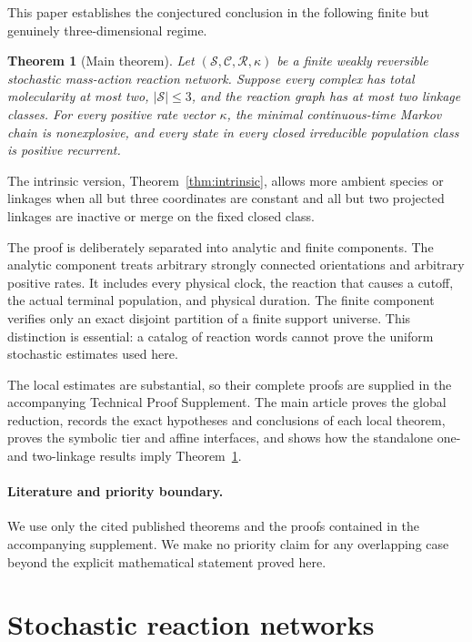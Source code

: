 \documentclass[11pt]{article}
\newtheorem{theorem}{Theorem}[section]
\theoremstyle{definition}
\theoremstyle{remark}
\newcommand{\cC}{\mathcal C}
\newcommand{\cR}{\mathcal R}
\newcommand{\cS}{\mathcal S}
\newcommand{\1}{\mathbf 1}
\begin{document}
This paper establishes the conjectured conclusion in the following finite but
genuinely three-dimensional regime.

\begin{theorem}[Main theorem]\label{thm:main}
Let $(\cS,\cC,\cR,\kappa)$ be a finite weakly reversible stochastic
mass-action reaction network.  Suppose every complex has total molecularity
at most two, $|\cS|\le3$, and the reaction graph has at most two linkage
classes.  For every positive rate vector $\kappa$, the minimal continuous-time
Markov chain is nonexplosive, and every state in every closed irreducible
population class is positive recurrent.
\end{theorem}

The intrinsic version, Theorem~\ref{thm:intrinsic}, allows more ambient
species or linkages when all but three coordinates are constant and all but
two projected linkages are inactive or merge on the fixed closed class.

The proof is deliberately separated into analytic and finite components.
The analytic component treats arbitrary strongly connected orientations and
arbitrary positive rates.  It includes every physical clock, the reaction
that causes a cutoff, the actual terminal population, and physical duration.
The finite component verifies only an exact disjoint partition of a finite
support universe.  This distinction is essential: a catalog of reaction
words cannot prove the uniform stochastic estimates used here.

The local estimates are substantial, so their complete proofs are supplied
in the accompanying Technical Proof Supplement.  The main article proves the
global reduction, records the exact hypotheses and conclusions of each local
theorem, proves the symbolic tier and affine interfaces, and shows how the
standalone one- and two-linkage results imply Theorem~\ref{thm:main}.

\paragraph{Literature and priority boundary.}
We use only the cited published theorems and the proofs contained in the
accompanying supplement.  We make no priority claim for any overlapping
case beyond the explicit mathematical statement proved here.

\section{Stochastic reaction networks}
\end{document}
